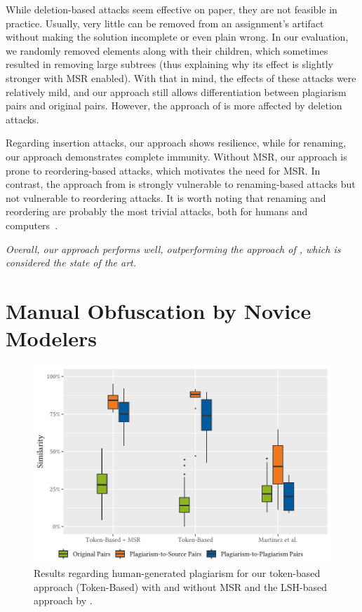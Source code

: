 While deletion-based attacks seem effective on paper, they are not feasible in practice.
Usually, very little can be removed from an assignment's artifact without making the solution incomplete or even plain wrong.
In our evaluation, we randomly removed elements along with their children, which sometimes resulted in removing large subtrees (thus explaining why its effect is slightly stronger with MSR enabled). With that in mind, the effects of these attacks were relatively mild, and our approach still allows differentiation between plagiarism pairs and original pairs. However, the approach of \citet{Martinez2020} is more affected by deletion attacks.

Regarding insertion attacks, our approach shows resilience, while for renaming, our approach demonstrates complete immunity. Without MSR, our approach is prone to reordering-based attacks, which motivates the need for MSR. In contrast, the approach from \citet{Martinez2020} is strongly vulnerable to renaming-based attacks but not vulnerable to reordering attacks.
It is worth noting that renaming and reordering are probably the most trivial attacks, both for humans and computers~\cite{Saglam2023}.

\textit{Overall, our approach performs well, outperforming the approach of \citet{Martinez2020}, which is considered the state of the art.}



\section{Manual Obfuscation by Novice Modelers}

\begin{figure}[b]
\centering
\includegraphics[width=1\linewidth]{figures/disseval2/experiment_avg.similarity.pdf}
\caption[Evaluation: Human Obfuscation of Models]{Results regarding human-generated plagiarism for our token-based approach (Token-Based) with and without MSR and the LSH-based approach by \citet{Martinez2020}.}
\label{fig:human-results}
\end{figure}

